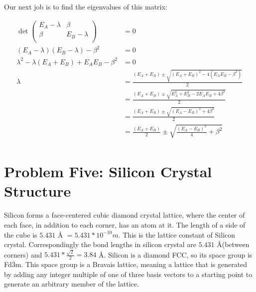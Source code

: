 \documentclass[10pt]{article} %
\begin{document}
Our next job is to find the eigenvalues of this matrix:

\begin{align*}
  \det\begin{pmatrix}
    E_A-\lambda & \beta\\
    \beta & E_B-\lambda\\
  \end{pmatrix}
  &= 0\\
  (E_A-\lambda)(E_B-\lambda) - \beta^2 &= 0\\
  \lambda^2 - \lambda(E_A + E_B )+ E_AE_B - \beta^2 &= 0\\
  \lambda &= \frac{(E_A + E_B) \pm \sqrt{(E_A + E_B)^2 - 4(E_AE_B - \beta^2)}}{2}\\
  &= \frac{(E_A + E_B) \pm \sqrt{E_A^2 + E_B^2 - 2E_AE_B + 4\beta^2}}{2}\\
  &= \frac{(E_A + E_B) \pm \sqrt{(E_A - E_B)^2 + 4\beta^2}}{2}\\
  &= \frac{(E_A + E_B)}{2} \pm \sqrt{\frac{(E_A - E_B)^2}{4} + \beta^2}\\
\end{align*}



\section{Problem Five: Silicon Crystal Structure}
Silicon forms a face-centered cubic diamond crystal lattice, where the center of each face, in
addition to each corner, has an atom at it. The length of a side of the cube is $5.431$ \AA
$= 5.431 * 10^{-10}m$. This is the lattice constant of Silicon crystal. Correspondingly the
bond lengths in silicon crystal are $5.431$ \AA (between corners) and
$5.431 * \frac{\sqrt{2}}{2} = 3.84$ \AA.
\hspace{2cm}
Silicon is a diamond FCC, so its space group is Fd$\overline{3}$m. This space group is a
Bravais lattice, meaning a lattice that is generated by adding any integer multiple of one
of three basis vectors to a starting point to generate an arbitrary member of the lattice.\\
\end{document}
